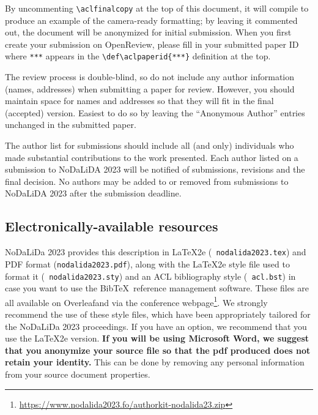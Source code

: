 \documentclass[11pt]{article}
\begin{document}
By uncommenting {\small\verb|\aclfinalcopy|} at the top of this 
 document, it will compile to produce an example of the camera-ready formatting; by leaving it commented out, the document will be anonymized for initial submission.  When you first create your submission on OpenReview, please fill in your submitted paper ID where {\small\verb|***|} appears in the {\small\verb|\def\aclpaperid{***}|} definition at the top.

The review process is double-blind, so do not include any author information (names, addresses) when submitting a paper for review.  
However, you should maintain space for names and addresses so that they will fit in the final (accepted) version. Easiest to do so by leaving the ``Anonymous Author'' entries unchanged in the submitted paper.

The author list for submissions should include all (and only) individuals who made substantial contributions to the work presented. Each author listed on a submission to NoDaLiDA 2023 will be notified of submissions, revisions and the final decision. No authors may be added to or removed from submissions to NoDaLiDA 2023 after the submission deadline.

\subsection{Electronically-available resources}

NoDaLiDa 2023 provides this description in \LaTeX2e ({\small {\tt
    nodalida2023.tex}}) and PDF format ({\small {\tt nodalida2023.pdf}}),
along with the \LaTeX2e style file used to format it ({\small {\tt
    nodalida2023.sty}}) and an ACL bibliography style ({\small {\tt
    acl.bst}}) in case you want to use the Bib\TeX\ reference management
software. These files are all available on Overleaf\footnotemark[1] and via the conference webpage\footnote{\url{https://www.nodalida2023.fo/authorkit-nodalida23.zip}}.
 We strongly
recommend the use of these style files, which have been appropriately
tailored for the NoDaLiDa 2023 proceedings. If you have an option, we
recommend that you use the \LaTeX2e version. \textbf{If you will be
  using Microsoft Word, we suggest that you anonymize
  your source file so that the pdf produced does not retain your
  identity.}  This can be done by removing any personal information
from your source document properties.
\end{document}
